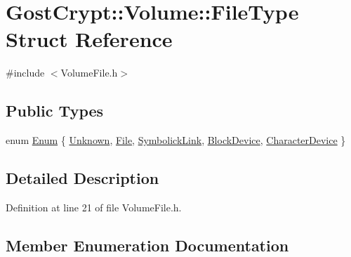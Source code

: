 \hypertarget{struct_gost_crypt_1_1_volume_1_1_file_type}{}\section{Gost\+Crypt\+:\+:Volume\+:\+:File\+Type Struct Reference}
\label{struct_gost_crypt_1_1_volume_1_1_file_type}


{\ttfamily \#include $<$Volume\+File.\+h$>$}

\subsection*{Public Types}
\begin{DoxyCompactItemize}
\item 
enum \hyperlink{struct_gost_crypt_1_1_volume_1_1_file_type_a83c327e2ac3e4260e070028644f577f7}{Enum} \{ \newline
\hyperlink{struct_gost_crypt_1_1_volume_1_1_file_type_a83c327e2ac3e4260e070028644f577f7a15f91ef1eb6b8c0e3f54f9db89cfc2d0}{Unknown}, 
\hyperlink{struct_gost_crypt_1_1_volume_1_1_file_type_a83c327e2ac3e4260e070028644f577f7a407b0becc3c957b0d4ec04519cb162ab}{File}, 
\hyperlink{struct_gost_crypt_1_1_volume_1_1_file_type_a83c327e2ac3e4260e070028644f577f7af163338dc3c36c22c78467f79023aeeb}{Symbolick\+Link}, 
\hyperlink{struct_gost_crypt_1_1_volume_1_1_file_type_a83c327e2ac3e4260e070028644f577f7ae751260b744f31c47a9350e17f7154cc}{Block\+Device}, 
\newline
\hyperlink{struct_gost_crypt_1_1_volume_1_1_file_type_a83c327e2ac3e4260e070028644f577f7a494f7b82bd9caf435af051b30dfdb619}{Character\+Device}
 \}
\end{DoxyCompactItemize}


\subsection{Detailed Description}


Definition at line 21 of file Volume\+File.\+h.



\subsection{Member Enumeration Documentation}
\mbox{\label{struct_gost_crypt_1_1_volume_1_1_file_type_a83c327e2ac3e4260e070028644f577f7}} 
